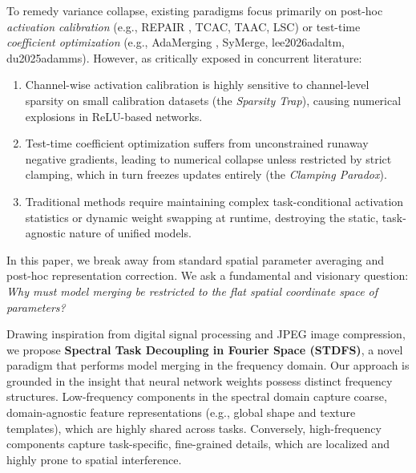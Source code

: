 \documentclass{article}
\theoremstyle{plain}
\theoremstyle{definition}
\theoremstyle{remark}
\begin{document}
To remedy variance collapse, existing paradigms focus primarily on post-hoc \textit{activation calibration} (e.g., REPAIR \cite{jordan2022repair}, TCAC, TAAC, LSC) or test-time \textit{coefficient optimization} (e.g., AdaMerging \cite{yang2024adamerging}, SyMerge, lee2026adaltm, du2025adamms). However, as critically exposed in concurrent literature:
\begin{enumerate}\itemsep=1pt \topsep=1pt \parsep=0pt
    \item Channel-wise activation calibration is highly sensitive to channel-level sparsity on small calibration datasets (the \textit{Sparsity Trap}), causing numerical explosions in ReLU-based networks.
    \item Test-time coefficient optimization suffers from unconstrained runaway negative gradients, leading to numerical collapse unless restricted by strict clamping, which in turn freezes updates entirely (the \textit{Clamping Paradox}).
    \item Traditional methods require maintaining complex task-conditional activation statistics or dynamic weight swapping at runtime, destroying the static, task-agnostic nature of unified models.
\end{enumerate}

In this paper, we break away from standard spatial parameter averaging and post-hoc representation correction. We ask a fundamental and visionary question: \textit{Why must model merging be restricted to the flat spatial coordinate space of parameters?}

Drawing inspiration from digital signal processing and JPEG image compression, we propose \textbf{Spectral Task Decoupling in Fourier Space (STDFS)}, a novel paradigm that performs model merging in the frequency domain. Our approach is grounded in the insight that neural network weights possess distinct frequency structures. Low-frequency components in the spectral domain capture coarse, domain-agnostic feature representations (e.g., global shape and texture templates), which are highly shared across tasks. Conversely, high-frequency components capture task-specific, fine-grained details, which are localized and highly prone to spatial interference.
\end{document}
